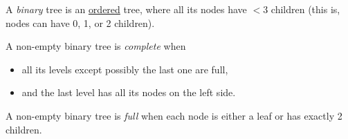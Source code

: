 A \emph{binary} tree is an \underline{ordered} tree, where all its nodes have $<3$ children
(this is, nodes can have 0, 1, or 2 children).

A non-empty binary tree is \emph{complete} when
\begin{itemize}
\item all its levels except possibly the last one are full,
\item and the last level has all its nodes on the left side.
\end{itemize}

A non-empty binary tree is \emph{full} when each node is either a leaf or has
exactly 2 children.
